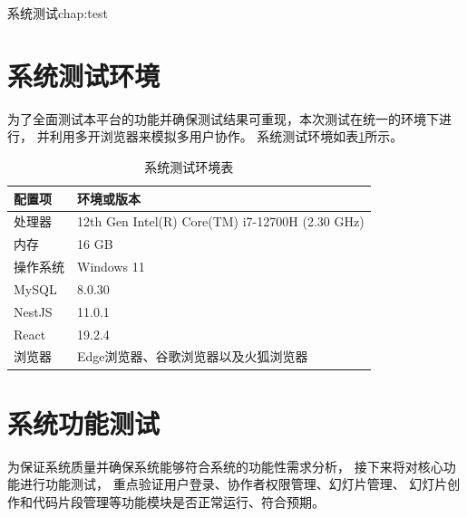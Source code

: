 \begin{cuzchapter}{系统测试}{chap:test}


    \section{系统测试环境}
    为了全面测试本平台的功能并确保测试结果可重现，本次测试在统一的环境下进行，
    并利用多开浏览器来模拟多用户协作。
    系统测试环境如表\ref{tab:testenv}所示。

\begin{table}[htbp]
    \centering
    \caption{系统测试环境表}
    \label{tab:testenv}
    \begin{tabular}{ll}
        \toprule
        配置项 & 环境或版本 \\
        \midrule
        处理器   & 12th Gen Intel(R) Core(TM) i7-12700H (2.30 GHz) \\
        \addlinespace
        内存     & 16 GB \\ 
        \addlinespace
        操作系统 & Windows 11 \\
        \addlinespace
        MySQL    & 8.0.30 \\
        \addlinespace
        NestJS & 11.0.1 \\
        \addlinespace 
        React & 19.2.4 \\
        \addlinespace
        浏览器   &  Edge浏览器、谷歌浏览器以及火狐浏览器 \\

        \bottomrule
    \end{tabular}
\end{table}
    

    \section{系统功能测试}
    为保证系统质量并确保系统能够符合系统的功能性需求分析，
    接下来将对核心功能进行功能测试，
    重点验证用户登录、协作者权限管理、幻灯片管理、
    幻灯片创作和代码片段管理等功能模块是否正常运行、符合预期。

\end{cuzchapter}
